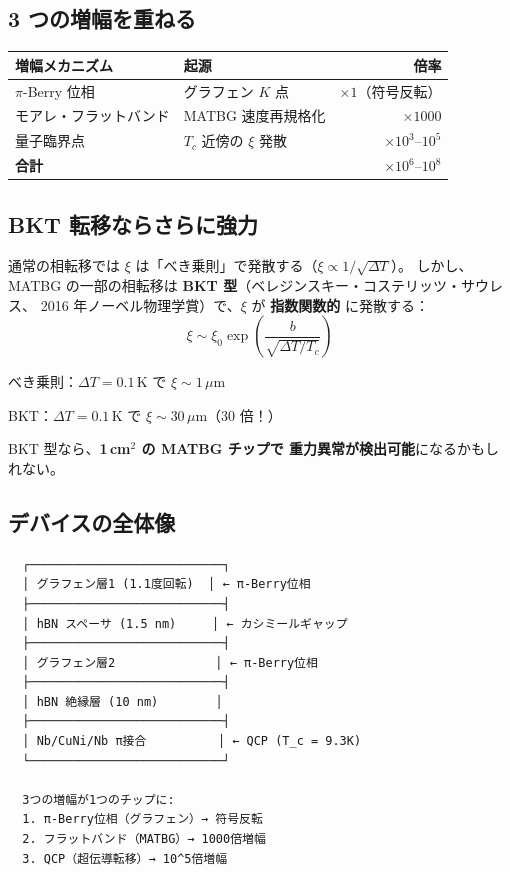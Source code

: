 \documentclass[11pt,a4paper]{article}
\begin{document}
\subsection{3 つの増幅を重ねる}

\begin{center}
\begin{tabular}{llr}
\toprule
増幅メカニズム & 起源 & 倍率 \\
\midrule
$\pi$-Berry 位相 & グラフェン $K$ 点 & $\times 1$（符号反転） \\
モアレ・フラットバンド & MATBG 速度再規格化 & $\times 1000$ \\
量子臨界点 & $T_c$ 近傍の $\xi$ 発散 & $\times 10^3$--$10^5$ \\
\midrule
\textbf{合計} & & $\times 10^6$--$10^8$ \\
\bottomrule
\end{tabular}
\end{center}

\subsection{BKT 転移ならさらに強力}

通常の相転移では $\xi$ は「べき乗則」で発散する（$\xi \propto 1/\sqrt{\Delta T}$）。
しかし、MATBG の一部の相転移は \textbf{BKT 型}（ベレジンスキー・コステリッツ・サウレス、
2016 年ノーベル物理学賞）で、$\xi$ が \textbf{指数関数的} に発散する：
\begin{equation}
  \xi \sim \xi_0 \exp\!\left(\frac{b}{\sqrt{\Delta T / T_c}}\right)
\end{equation}

\begin{tcolorbox}[colback=purple!5,colframe=purple!50!black,title=BKT の威力]
べき乗則：$\Delta T = 0.1$\,K で $\xi \sim 1\,\mu$m

BKT：$\Delta T = 0.1$\,K で $\xi \sim 30\,\mu$m（30 倍！）

BKT 型なら、\textbf{1\,cm$^2$ の MATBG チップで
重力異常が検出可能}になるかもしれない。
\end{tcolorbox}

\subsection{デバイスの全体像}

\begin{verbatim}
  ┌───────────────────────────┐
  │ グラフェン層1 (1.1度回転)  │ ← π-Berry位相
  ├───────────────────────────┤
  │ hBN スペーサ (1.5 nm)     │ ← カシミールギャップ
  ├───────────────────────────┤
  │ グラフェン層2              │ ← π-Berry位相
  ├───────────────────────────┤
  │ hBN 絶縁層 (10 nm)        │
  ├───────────────────────────┤
  │ Nb/CuNi/Nb π接合          │ ← QCP (T_c = 9.3K)
  └───────────────────────────┘

  3つの増幅が1つのチップに:
  1. π-Berry位相（グラフェン）→ 符号反転
  2. フラットバンド（MATBG）→ 1000倍増幅
  3. QCP（超伝導転移）→ 10^5倍増幅
\end{verbatim}
\end{document}
